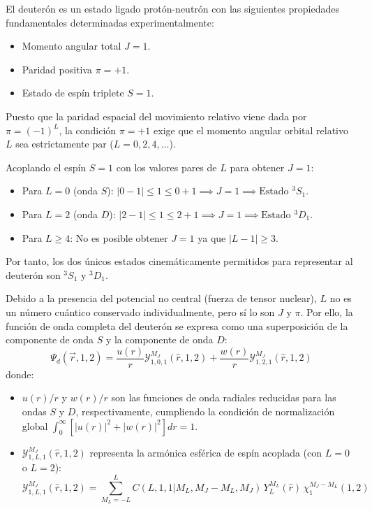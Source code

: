\begin{problema}
El deuterón es un estado ligado protón-neutrón con las siguientes propiedades fundamentales determinadas experimentalmente:
\begin{itemize}
    \item Momento angular total $J = 1$.
    \item Paridad positiva $\pi = +1$.
    \item Estado de espín triplete $S = 1$.
\end{itemize}

Puesto que la paridad espacial del movimiento relativo viene dada por $\pi = (-1)^L$, la condición $\pi = +1$ exige que el momento angular orbital relativo $L$ sea estrictamente par ($L = 0, 2, 4, \dots$).

Acoplando el espín $S = 1$ con los valores pares de $L$ para obtener $J = 1$:
\begin{itemize}
    \item Para $L = 0$ (onda $S$): $|0 - 1| \le 1 \le 0 + 1 \implies J = 1 \implies \text{Estado } {}^3S_1$.
    \item Para $L = 2$ (onda $D$): $|2 - 1| \le 1 \le 2 + 1 \implies J = 1 \implies \text{Estado } {}^3D_1$.
    \item Para $L \ge 4$: No es posible obtener $J = 1$ ya que $|L - 1| \ge 3$.
\end{itemize}

Por tanto, los dos únicos estados cinemáticamente permitidos para representar al deuterón son ${}^3S_1$ y ${}^3D_1$.

Debido a la presencia del potencial no central (fuerza de tensor nuclear), $L$ no es un número cuántico conservado individualmente, pero sí lo son $J$ y $\pi$. Por ello, la función de onda completa del deuterón se expresa como una superposición de la componente de onda $S$ y la componente de onda $D$:
\begin{equation}
\Psi_d(\vec{r}, 1, 2) = \frac{u(r)}{r} \mathcal{Y}_{1,0,1}^{M_J}(\hat{r}, 1, 2) + \frac{w(r)}{r} \mathcal{Y}_{1,2,1}^{M_J}(\hat{r}, 1, 2)
\end{equation}
donde:
\begin{itemize}
    \item $u(r)/r$ y $w(r)/r$ son las funciones de onda radiales reducidas para las ondas $S$ y $D$, respectivamente, cumpliendo la condición de normalización global $\int_0^\infty \left[ |u(r)|^2 + |w(r)|^2 \right] dr = 1$.
    \item $\mathcal{Y}_{1,L,1}^{M_J}(\hat{r}, 1, 2)$ representa la armónica esférica de espín acoplada (con $L = 0$ o $L = 2$):
    \begin{equation}
    \mathcal{Y}_{1,L,1}^{M_J}(\hat{r}, 1, 2) = \sum_{M_L = -L}^L C(L, 1, 1 | M_L, M_J - M_L, M_J) \, Y_L^{M_L}(\hat{r}) \, \chi_1^{M_J - M_L}(1,2)
    \end{equation}
\end{itemize}


\end{problema}
